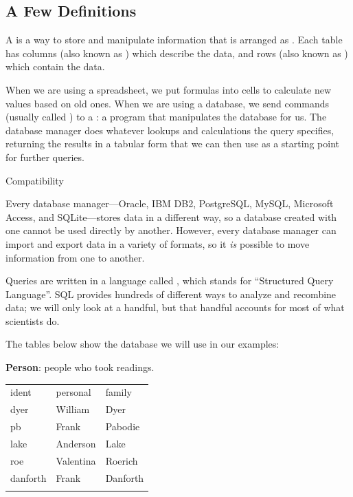 \documentclass{book}
\begin{document}
\subsection{A Few Definitions}

A  is a way to
store and manipulate information that is arranged as
. Each table has columns (also known
as ) which describe the data, and
rows (also known as ) which contain
the data.

When we are using a spreadsheet, we put formulas into cells to calculate
new values based on old ones. When we are using a database, we send
commands (usually called ) to a
: a program that
manipulates the database for us. The database manager does whatever
lookups and calculations the query specifies, returning the results in a
tabular form that we can then use as a starting point for further
queries.

\begin{swcbox}{Compatibility}

Every database manager---Oracle, IBM DB2, PostgreSQL, MySQL, Microsoft
Access, and SQLite---stores data in a different way, so a database
created with one cannot be used directly by another. However, every
database manager can import and export data in a variety of formats, so
it \emph{is} possible to move information from one to another.

\end{swcbox}

Queries are written in a language called , which
stands for ``Structured Query Language''. SQL provides hundreds of
different ways to analyze and recombine data; we will only look at a
handful, but that handful accounts for most of what scientists do.

The tables below show the database we will use in our examples:

\textbf{Person}: people who took readings.

\begin{tabular}{@{}lll@{}}
\hline\noalign{\medskip}
ident & personal & family
\\\noalign{\medskip}
\hline\noalign{\medskip}
dyer & William & Dyer
\\\noalign{\medskip}
pb & Frank & Pabodie
\\\noalign{\medskip}
lake & Anderson & Lake
\\\noalign{\medskip}
roe & Valentina & Roerich
\\\noalign{\medskip}
danforth & Frank & Danforth
\\\noalign{\medskip}
\hline
\end{tabular}
\end{document}
